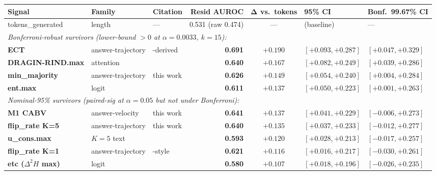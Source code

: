 \documentclass[11pt]{article}
\begin{document}
\begin{table}[t]
\centering\small
\begin{tabular}{@{}lllrcll@{}}
\toprule
\textbf{Signal} & \textbf{Family} & \textbf{Citation} &
\textbf{Resid AUROC} & $\boldsymbol{\Delta}$ \textbf{vs.\ tokens} &
\textbf{95\% CI} & \textbf{Bonf.~99.67\% CI} \\
\midrule
tokens\_generated         & length         & ---                            & 0.531 (raw 0.474) & --- & (baseline) & --- \\
\midrule
\multicolumn{7}{l}{\textit{Bonferroni-robust survivors (lower-bound $>0$ at $\alpha=0.0033$, $k=15$):}} \\
\midrule
\textbf{ECT}           & answer-trajectory & \citep{Datta_DecideEarlyExplainLater}-derived & \textbf{0.691} & $\boldsymbol{+0.190}$ & $[+0.093, +0.287]$ & $[+0.047, +0.329]$ \\
\textbf{DRAGIN-RIND.max}  & attention      & \citep{Su_DRAGIN}              & \textbf{0.640} & $\boldsymbol{+0.167}$ & $[+0.082, +0.249]$ & $[+0.039, +0.286]$ \\
\textbf{min\_majority}& answer-trajectory & this work                   & \textbf{0.626} & $\boldsymbol{+0.149}$ & $[+0.054, +0.240]$ & $[+0.004, +0.284]$ \\
\textbf{ent.max}          & logit          & \citep{Lin_GeneratingConfidence} & \textbf{0.611} & $\boldsymbol{+0.137}$ & $[+0.050, +0.223]$ & $[+0.001, +0.263]$ \\
\midrule
\multicolumn{7}{l}{\textit{Nominal-95\% survivors (paired-sig at $\alpha=0.05$ but not under Bonferroni):}} \\
\midrule
\textbf{M1 CABV}          & answer-velocity & this work                     & \textbf{0.641} & $\boldsymbol{+0.137}$ & $[+0.041, +0.229]$ & $[-0.006, +0.273]$ \\
\textbf{flip\_rate K=5}& answer-trajectory & this work                  & \textbf{0.640} & $\boldsymbol{+0.135}$ & $[+0.037, +0.233]$ & $[-0.012, +0.277]$ \\
\textbf{u\_cons.max}      & $K{=}5$ text   & \citep{Manakul_SelfCheckGPT}   & \textbf{0.593} & $\boldsymbol{+0.120}$ & $[+0.028, +0.213]$ & $[-0.017, +0.257]$ \\
\textbf{flip\_rate K=1}& answer-trajectory & \citep{Datta_DecideEarlyExplainLater}-style & \textbf{0.621} & $\boldsymbol{+0.116}$ & $[+0.016, +0.217]$ & $[-0.030, +0.261]$ \\
\textbf{etc ($\Delta^2 H$ max)} & logit    & \citep{Li_ETC}                 & \textbf{0.580} & $\boldsymbol{+0.107}$ & $[+0.018, +0.196]$ & $[-0.026, +0.235]$ \\

\end{tabular}
\end{table}
\end{document}
